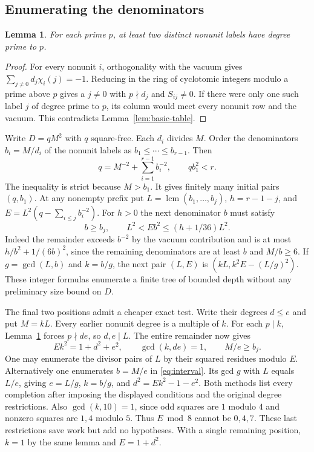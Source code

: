 \documentclass[11pt]{amsart}
\numberwithin{equation}{section}
\newtheorem{lemma}[theorem]{Lemma}
\begin{document}
\subsection{Enumerating the denominators}
\begin{lemma}\label{lem:deletion}
For each prime $p$, at least two distinct nonunit labels have degree prime to $p$.
\end{lemma}
\begin{proof}
For every nonunit $i$, orthogonality with the vacuum gives $\sum_{j\ne0}d_j\chi_i(j)=-1$. Reducing in the ring of cyclotomic integers modulo a prime above $p$ gives a $j\ne0$ with $p\nmid d_j$ and $S_{ij}\ne0$. If there were only one such label $j$ of degree prime to $p$, its column would meet every nonunit row and the vacuum. This contradicts Lemma~\ref{lem:basic-table}.
\end{proof}

Write $D=qM^2$ with $q$ square-free. Each $d_i$ divides $M$. Order the denominators $b_i=M/d_i$ of the nonunit labels as $b_1\le\cdots\le b_{r-1}$. Then
\begin{equation}\label{eq:recip}
 q=M^{-2}+\sum_{i=1}^{r-1}b_i^{-2},\qquad q b_1^2<r .
\end{equation}
The inequality is strict because $M>b_1$. It gives finitely many initial pairs $(q,b_1)$. At any nonempty prefix put $L=\operatorname{lcm}(b_1,\ldots,b_j)$, $h=r-1-j$, and $E=L^2(q-\sum_{i\le j}b_i^{-2})$. For $h>0$ the next denominator $b$ must satisfy
\begin{equation}\label{eq:interval}
 b\ge b_j,\qquad L^2<Eb^2\le(h+1/36)L^2.
\end{equation}
Indeed the remainder exceeds $b^{-2}$ by the vacuum contribution and is at most $h/b^2+1/(6b)^2$, since the remaining denominators are at least $b$ and $M/b\ge6$. If $g=\gcd(L,b)$ and $k=b/g$, the next pair $(L,E)$ is $(kL,k^2E-(L/g)^2)$. These integer formulas enumerate a finite tree of bounded depth without any preliminary size bound on $D$.

The final two positions admit a cheaper exact test. Write their degrees $d\le e$ and put $M=kL$. Every earlier nonunit degree is a multiple of $k$. For each $p\mid k$, Lemma~\ref{lem:deletion} forces $p\nmid de$, so $d,e\mid L$. The entire remainder now gives
\[
 Ek^2=1+d^2+e^2,\qquad \gcd(k,de)=1,\qquad M/e\ge b_j.
\]
One may enumerate the divisor pairs of $L$ by their squared residues modulo $E$. Alternatively one enumerates $b=M/e$ in \eqref{eq:interval}. Its gcd $g$ with $L$ equals $L/e$, giving $e=L/g$, $k=b/g$, and $d^2=Ek^2-1-e^2$. Both methods list every completion after imposing the displayed conditions and the original degree restrictions. Also $\gcd(k,10)=1$, since odd squares are $1$ modulo $4$ and nonzero squares are $1,4$ modulo $5$. Thus $E\bmod 8$ cannot be $0,4,7$. These last restrictions save work but add no hypotheses. With a single remaining position, $k=1$ by the same lemma and $E=1+d^2$.
\end{document}
